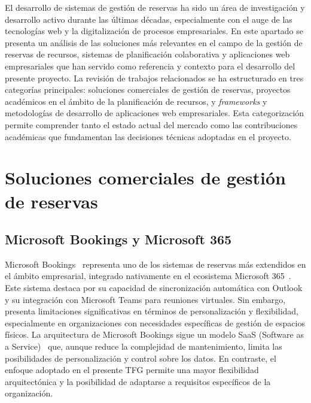 
El desarrollo de sistemas de gestión de reservas ha sido un área de investigación y desarrollo activo durante las últimas décadas, especialmente con el auge de las tecnologías web y la digitalización de procesos empresariales. En este apartado se presenta un análisis de las soluciones más relevantes en el campo de la gestión de reservas de recursos, sistemas de planificación colaborativa y aplicaciones web empresariales que han servido como referencia y contexto para el desarrollo del presente proyecto.
La revisión de trabajos relacionados se ha estructurado en tres categorías principales: soluciones comerciales de gestión de reservas, proyectos académicos en el ámbito de la planificación de recursos, y \emph{frameworks} y metodologías de desarrollo de aplicaciones web empresariales. Esta categorización permite comprender tanto el estado actual del mercado como las contribuciones académicas que fundamentan las decisiones técnicas adoptadas en el proyecto.

\section{Soluciones comerciales de gestión de reservas}\label{soluciones-comerciales-gestion-reservas}
\subsection{Microsoft Bookings y Microsoft 365}\label{microsoft-booking-microsoft-365}
Microsoft Bookings~\cite{microsoft-booking} representa uno de los sistemas de reservas más extendidos en el ámbito empresarial, integrado nativamente en el ecosistema Microsoft 365~\cite{microsoft-365}. Este sistema destaca por su capacidad de sincronización automática con Outlook y su integración con Microsoft Teams para reuniones virtuales. Sin embargo, presenta limitaciones significativas en términos de personalización y flexibilidad, especialmente en organizaciones con necesidades específicas de gestión de espacios físicos.
La arquitectura de Microsoft Bookings sigue un modelo SaaS (Software as a Service)~\cite{saas} que, aunque reduce la complejidad de mantenimiento, limita las posibilidades de personalización y control sobre los datos. En contraste, el enfoque adoptado en el presente TFG permite una mayor flexibilidad arquitectónica y la posibilidad de adaptarse a requisitos específicos de la organización.

